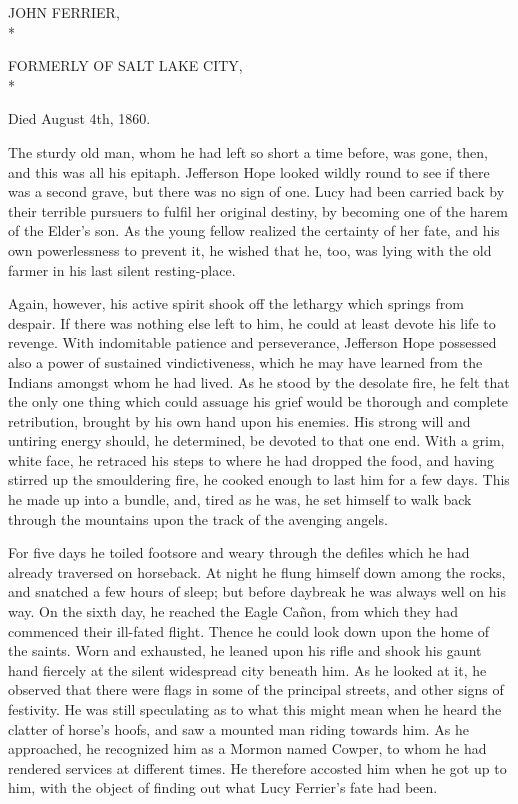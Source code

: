 \documentclass[12pt,english,oneside]{book}
\begin{document}
\begin{center} \sc

JOHN FERRIER, \\*

\small FORMERLY OF SALT LAKE CITY, \\*

Died August 4th, 1860.

\end{center}

The sturdy old man, whom he had left so short a time before, was gone,
then, and this was all his epitaph. Jefferson Hope looked wildly round
to see if there was a second grave, but there was no sign of one.
Lucy had been carried back by their terrible pursuers to fulfil her
original destiny, by becoming one of the harem of the Elder's son.
As the young fellow realized the certainty of her fate, and his own
powerlessness to prevent it, he wished that he, too, was lying with
the old farmer in his last silent resting-place.

Again, however, his active spirit shook off the lethargy which springs
from despair. If there was nothing else left to him, he could at least
devote his life to revenge. With indomitable patience and perseverance,
Jefferson Hope possessed also a power of sustained vindictiveness,
which he may have learned from the Indians amongst whom he had lived.
As he stood by the desolate fire, he felt that the only one thing
which could assuage his grief would be thorough and complete retribution,
brought by his own hand upon his enemies. His strong will and untiring
energy should, he determined, be devoted to that one end. With a grim,
white face, he retraced his steps to where he had dropped the food,
and having stirred up the smouldering fire, he cooked enough to last
him for a few days. This he made up into a bundle, and, tired as he
was, he set himself to walk back through the mountains upon the track
of the avenging angels.

For five days he toiled footsore and weary through the defiles which
he had already traversed on horseback. At night he flung himself down
among the rocks, and snatched a few hours of sleep; but before daybreak
he was always well on his way. On the sixth day, he reached the Eagle
Ca\~{n}on, from which they had commenced their ill-fated flight. Thence
he could look down upon the home of the saints. Worn and exhausted,
he leaned upon his rifle and shook his gaunt hand fiercely at the
silent widespread city beneath him. As he looked at it, he observed
that there were flags in some of the principal streets, and other
signs of festivity. He was still speculating as to what this might
mean when he heard the clatter of horse's hoofs, and saw a mounted
man riding towards him. As he approached, he recognized him as a Mormon
named Cowper, to whom he had rendered services at different times.
He therefore accosted him when he got up to him, with the object of
finding out what Lucy Ferrier's fate had been.
\end{document}
